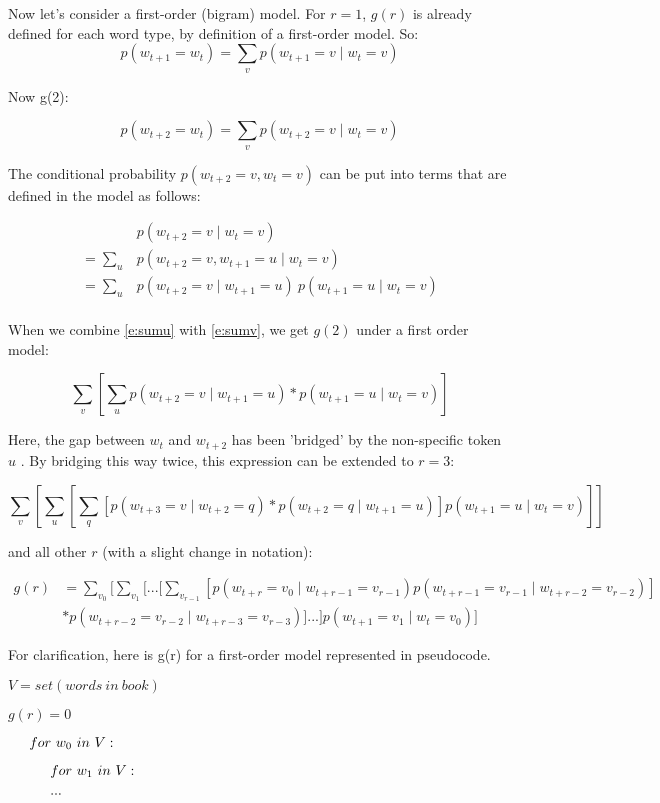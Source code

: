 \documentclass[11pt,letterpaper]{article}
\theoremstyle{definition}
\begin{document}
Now let's consider a first-order (bigram) model. For $r=1$, $g(r)$ is already defined for each word type, by definition of a first-order model. So:
\[p(w_{t+1} = w_{t}) =  \sum_v p(w_{t+1} = v \mid w_{t} = v)\]

Now g(2):

\[p(w_{t+2} = w_{t}) =  \sum_v p(w_{t+2} = v \mid w_{t} = v) \label{e:sumv} \]

 The conditional probability $p(w_{t+2} = v , w_{t} = v)$ can be put into terms that are defined in the model as follows:

\begin{align}
&p(w_{t+2} = v  \mid w_{t} = v)\\
= \sum_u &p(w_{t+2} = v , w_{t+1} = u \mid w_{t} = v)\\
= \sum_u &p(w_{t+2} = v \mid w_{t+1} = u ) \ p(w_{t+1} = u \mid w_{t} = v) \label{e:sumu} \\
\end{align}

When we combine \ref{e:sumu} with \ref{e:sumv}, we get $g(2)$ under a first order model:


\[ \sum_v [\sum_u p(w_{t+2} = v \mid w_{t+1} = u ) * p(w_{t+1} = u \mid w_{t} = v)]  \]

Here, the gap between $w_t$ and $w_{t+2}$ has been 'bridged' by the non-specific token $u$ . By bridging this way twice, this expression can be extended to $r = 3$:


\[ \sum_v [\sum_u [\sum_q [p(w_{t+3} = v \mid w_{t+2} = q ) * p(w_{t+2} = q \mid w_{t+1} = u)] p(w_{t+1} = u \mid w_{t} = v) ] ]\]

and all other $r$ (with a slight change in notation):

\begin{align} g(r) &= \sum_{v_0}[ \sum_{v_1} [ ... [ \sum_{v_{r-1}} [ p(w_{t+r} = v_0 \mid w_{t+r-1} = v_{r-1}) p(w_{t+r-1} = v_{r-1} \mid w_{t+r-2} = v_{r-2})] \\
& * p(w_{t+r-2} = v_{r-2} \mid w_{t+r-3} = v_{r-3})]... ] p(w_{t+1} = v_{1} \mid w_{t} = v_0)]
\end{align}

For clarification, here is g(r) for a first-order model represented in pseudocode.

$V = set(words\ in\ book)$

$g(r) = 0$  

$\indent for\ w_0\ in\ V:$

$\indent \indent for\ w_1\ in\ V:$

$\indent \indent ...$
\end{document}
